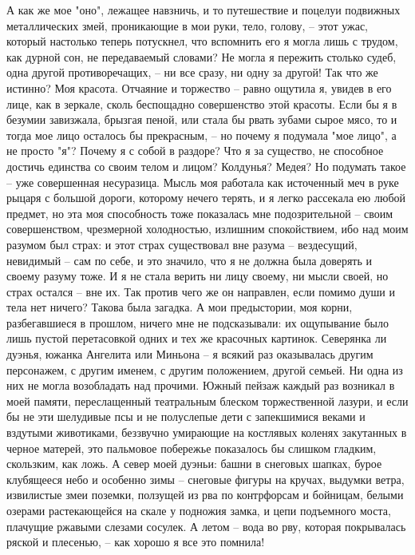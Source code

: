 А как же  мое "оно", лежащее навзничь, и то  путешествие и поцелуи подвижных
металлических  змей, проникающие  в мои  руки, тело,  голову, --  этот ужас,
который настолько теперь потускнел, что вспомнить его я могла лишь с трудом,
как дурной сон, не передаваемый словами?  Не могла я пережить столько судеб,
одна другой противоречащих, --  ни все сразу, ни одну за  другой! Так что же
истинно? Моя красота. Отчаяние и торжество  -- равно ощутила я, увидев в его
лице, как в зеркале, сколь беспощадно совершенство этой красоты. Если бы я в
безумии завизжала, брызгая пеной, или стала бы рвать зубами сырое мясо, то и
тогда мое лицо осталось бы прекрасным, -- но почему я подумала "мое лицо", а
не просто "я"? Почему  я с собой в раздоре? Что я  за существо, не способное
достичь единства со своим телом и  лицом? Колдунья? Медея? Но подумать такое
-- уже совершенная несуразица. Мысль моя  работала как источенный меч в руке
рыцаря с  большой дороги,  которому нечего  терять, и  я легко  рассекала ею
любой предмет, но эта моя  способность тоже показалась мне подозрительной --
своим совершенством, чрезмерной холодностью,  излишним спокойствием, ибо над
моим разумом был  страх: и этот страх существовал вне  разума -- вездесущий,
невидимый --  сам по себе, и  это значило, что  я не должна была  доверять и
своему разуму тоже. И  я не стала верить ни лицу своему,  ни мысли своей, но
страх остался -- вне их. Так против чего же он направлен, если помимо души и
тела  нет  ничего?  Такова  была  загадка. А  мои  предыстории,  моя  корни,
разбегавшиеся в прошлом, ничего мне не подсказывали: их ощупывание было лишь
пустой перетасовкой одних и тех  же красочных картинок. Северянка ли дуэнья,
южанка Ангелита или Миньона -- я всякий раз оказывалась другим персонажем, с
другим именем, с  другим положением, другой семьей. Ни одна  из них не могла
возобладать над  прочими. Южный  пейзаж каждый раз  возникал в  моей памяти,
переслащенный театральным  блеском торжественной  лазури, и  если бы  не эти
шелудивые  псы  и  не  полуслепые  дети  с  запекшимися  веками  и  вздутыми
животиками,  беззвучно умирающие  на костлявых  коленях закутанных  в черное
матерей, это  пальмовое побережье показалось бы  слишком гладким, скользким,
как ложь.  А север моей  дуэньи: башни  в снеговых шапках,  бурое клубящееся
небо и особенно зимы -- снеговые фигуры на кручах, выдумки ветра, извилистые
змеи  поземки, ползущей  из рва  по контрфорсам  и бойницам,  белыми озерами
растекающейся на скале  у подножия замка, и цепи  подъемного моста, плачущие
ржавыми слезами сосулек. А летом --  вода во рву, которая покрывалась ряской
и плесенью, -- как хорошо я все это помнила!

